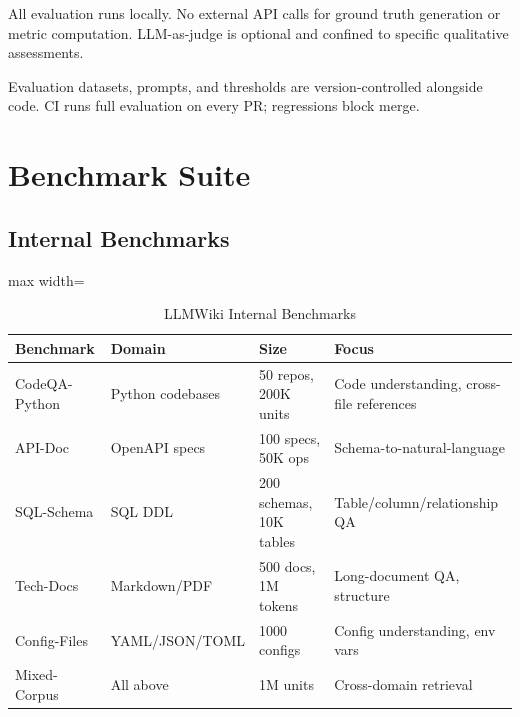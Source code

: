 \begin{designprinciple}
All evaluation runs locally. No external API calls for ground truth generation or metric computation. LLM-as-judge is optional and confined to specific qualitative assessments.
\end{designprinciple}

\begin{designprinciple}
Evaluation datasets, prompts, and thresholds are version-controlled alongside code. CI runs full evaluation on every PR; regressions block merge.
\end{designprinciple}

\section{Benchmark Suite}
\label{sec:eval:benchmarks}

\subsection{Internal Benchmarks}
\label{sec:eval:internal}

\begin{table}[htbp]
\centering
\caption{LLMWiki Internal Benchmarks}
\label{tab:eval:internal}
\begin{adjustbox}{max width=\textwidth}
\begin{tabular}{llll}
\toprule
\textbf{Benchmark} & \textbf{Domain} & \textbf{Size} & \textbf{Focus} \\
\midrule
CodeQA-Python & Python codebases & 50 repos, 200K units & Code understanding, cross-file references \\
API-Doc & OpenAPI specs & 100 specs, 50K ops & Schema-to-natural-language \\
SQL-Schema & SQL DDL & 200 schemas, 10K tables & Table/column/relationship QA \\
Tech-Docs & Markdown/PDF & 500 docs, 1M tokens & Long-document QA, structure \\
Config-Files & YAML/JSON/TOML & 1000 configs & Config understanding, env vars \\
Mixed-Corpus & All above & 1M units & Cross-domain retrieval \\
\bottomrule
\end{tabular}
\end{adjustbox}
\end{table}

